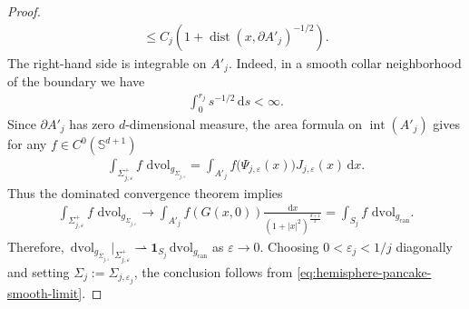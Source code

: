\documentclass[11pt,reqno]{amsart}
\numberwithin{equation}{section}
\theoremstyle{definition}
\theoremstyle{remark}
\def\bS {\mathbb{S}}
\newcommand{\wto}{\rightharpoonup}
\newcommand{\dist}{\operatorname{dist}}
\newcommand{\ud}{\mathrm{d}}
\newcommand{\0}{\emptyset}
\newcommand{\veps}{\varepsilon}
\newcommand{\can}{\mathrm{can}}
\newcommand{\dvol}{\,\mathrm{dvol}}
\begin{document}
\begin{proof}
\begin{align}
        \leq
        C_j ( 1+
        \dist(x,\partial A'_j)^{-1/2}).
\end{align}
The right-hand side is integrable on $A'_j$.  Indeed, in a smooth collar neighborhood of the boundary we have
\begin{align}
        \int_0^{r_j}s^{-1/2}\,\ud s
        <
        \infty.
\end{align}
Since $\partial A'_j$ has zero $d$-dimensional measure, the area formula
on $\operatorname{int}(A'_j)$ gives for any $f\in C^0(\bS^{d+1})$
\begin{align}
        \int_{\Sigma_{j,\varepsilon}^+}
        f\,\dvol_{g_{\Sigma_{j,\varepsilon}}}
        =
        \int_{A'_j}
        f\bigl(\Psi_{j,\varepsilon}(x)\bigr)
        J_{j,\varepsilon}(x)\,\ud x.
\end{align}
Thus the dominated convergence theorem implies
\begin{align}
        \int_{\Sigma_{j,\varepsilon}^+}
        f\,\dvol_{g_{\Sigma_{j,\varepsilon}}}
        \rightarrow
        \int_{A'_j}
        f(G(x,0))
        \frac{\ud x}{(1+|x|^2)^{\frac{d+1}{2}}}
        =
        \int_{S_j}f\,\dvol_{g_{\can}}.
\end{align}
Therefore, $ \dvol_{g_{\Sigma_{j,\varepsilon}}} |_{\Sigma_{j,\varepsilon}^+} \wto \mathbf{1}_{S_j}\dvol_{g_{\can}}$ as $\veps\to 0.$ Choosing $0<\varepsilon_j<1/j$ diagonally and setting $\Sigma_j:=\Sigma_{j,\varepsilon_j}$, the conclusion follows from
\eqref{eq:hemisphere-pancake-smooth-limit}.
\end{proof}
\end{document}
